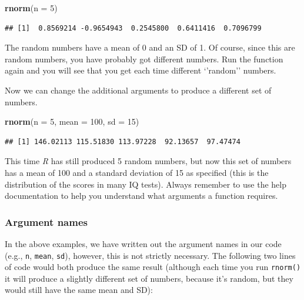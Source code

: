 \documentclass[
]{scrartcl}
\newenvironment{Shaded}{\begin{snugshade}}{\end{snugshade}}
\newcommand{\AttributeTok}[1]{\textcolor[rgb]{0.13,0.29,0.53}{#1}}
\newcommand{\DecValTok}[1]{\textcolor[rgb]{0.00,0.00,0.81}{#1}}
\newcommand{\FunctionTok}[1]{\textcolor[rgb]{0.13,0.29,0.53}{\textbf{#1}}}
\newcommand{\NormalTok}[1]{#1}
\begin{document}
\begin{Shaded}
\begin{Highlighting}[]
\FunctionTok{rnorm}\NormalTok{(}\AttributeTok{n =} \DecValTok{5}\NormalTok{)}
\end{Highlighting}
\end{Shaded}

\begin{verbatim}
## [1]  0.8569214 -0.9654943  0.2545800  0.6411416  0.7096799
\end{verbatim}

The random numbers have a mean of 0 and an SD of 1. Of course, since this are random numbers, you have probably got different numbers. Run the function again and you will see that you get each time different `'random'' numbers.

Now we can change the additional arguments to produce a different set of numbers.

\begin{Shaded}
\begin{Highlighting}[]
\FunctionTok{rnorm}\NormalTok{(}\AttributeTok{n =} \DecValTok{5}\NormalTok{, }\AttributeTok{mean =} \DecValTok{100}\NormalTok{, }\AttributeTok{sd =} \DecValTok{15}\NormalTok{)}
\end{Highlighting}
\end{Shaded}

\begin{verbatim}
## [1] 146.02113 115.51830 113.97228  92.13657  97.47474
\end{verbatim}

This time \emph{R} has still produced 5 random numbers, but now this set of numbers has a mean of 100 and a standard deviation of 15 as specified (this is the distribution of the scores in many IQ tests). Always remember to use the help documentation to help you understand what arguments a function requires.

\hypertarget{argument-names}{%
\subsubsection{Argument names}\label{argument-names}}

In the above examples, we have written out the argument names in our code (e.g., \texttt{n}, \texttt{mean}, \texttt{sd}), however, this is not strictly necessary. The following two lines of code would both produce the same result (although each time you run \texttt{rnorm()} it will produce a slightly different set of numbers, because it's random, but they would still have the same mean and SD):
\end{document}
